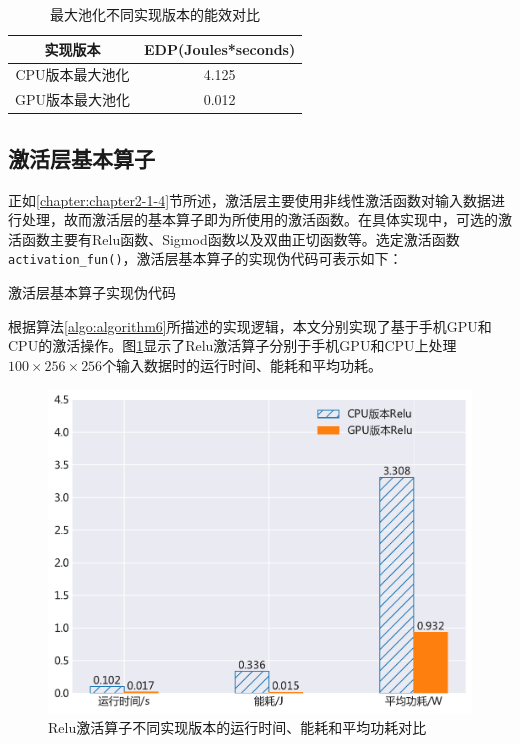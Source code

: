 \begin{table}[htbp]
  \centering
  \caption{最大池化不同实现版本的能效对比}
  \label{table:table3}
  \begin{tabular}{cc}
    \toprule
      实现版本 & EDP(Joules*seconds) \\
    \midrule
      CPU版本最大池化 & 4.125 \\
      GPU版本最大池化 & 0.012 \\
    \bottomrule
  \end{tabular}
\end{table}


\subsection{激活层基本算子}

正如\ref{chapter:chapter2-1-4}节所述，激活层主要使用非线性激活函数对输入数据进行处理，故而激活层的基本算子即为所使用的激活函数。在具体实现中，可选的激活函数主要有Relu函数、Sigmod函数以及双曲正切函数等。选定激活函数\texttt{activation\_fun()}，激活层基本算子的实现伪代码可表示如下：

\begin{algorithm}[htbp]
  \small
  \SetAlgoLined
  \caption{激活层基本算子实现伪代码}
  \label{algo:algorithm6}
\end{algorithm}

根据算法\ref{algo:algorithm6}所描述的实现逻辑，本文分别实现了基于手机GPU和CPU的激活操作。图\ref{figure:figure13}显示了Relu激活算子分别于手机GPU和CPU上处理$100 \times 256 \times 256 $个输入数据时的运行时间、能耗和平均功耗。

\begin{figure}[htb]
    \begin{center}
    \includegraphics[height=0.4\textwidth]{figures/relu_energy.pdf}
    \end{center}
    \caption{Relu激活算子不同实现版本的运行时间、能耗和平均功耗对比}\label{figure:figure13}
\end{figure}

